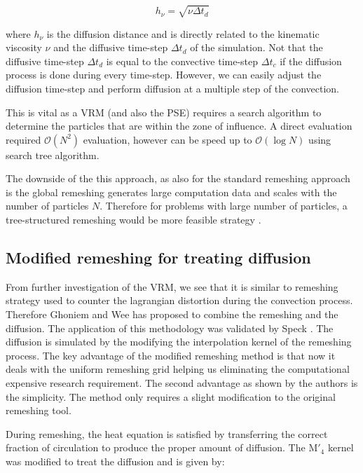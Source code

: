 	\begin{equation}
	h_{\nu} = \sqrt{\nu\Delta t_d}
	\end{equation}

where $h_{\nu}$ is the diffusion distance and is directly related to the kinematic viscosity $\nu$ and the diffusive time-step $\Delta t_d$ of the simulation. Not that the diffusive time-step $\Delta t_d$ is equal to the convective time-step $\Delta t_c$ if the diffusion process is done during every time-step. However, we can easily adjust the diffusion time-step and perform diffusion at a multiple step of the convection.

This is vital as a VRM (and also the PSE) requires a search algorithm to determine the particles that are within the zone of influence. A direct evaluation required $\mathcal{O}\left(N^2\right)$ evaluation, however can be speed up to $\mathcal{O}\left(\log N\right)$ using search tree algorithm.

The downside of the this approach, as also for the standard remeshing approach is the global remeshing generates large computation data and scales with the number of particles $N$. Therefore for problems with large number of particles, a tree-structured remeshing would be more feasible strategy \cite{Winckelmans1996}.

\subsection{Modified remeshing for treating diffusion}
From further investigation of the VRM, we see that it is similar to remeshing strategy used to counter the lagrangian distortion during the convection process. Therefore Ghoniem and Wee \cite{Wee2006} has proposed to combine the remeshing and the diffusion. The application of this methodology was validated by Speck \cite{Speck2011a}. The diffusion is simulated by the modifying the interpolation kernel of the remeshing process. The key advantage of the modified remeshing method is that now it deals with the uniform remeshing grid helping us eliminating the computational expensive research requirement. The second advantage as shown by the authors is the simplicity. The method only requires a slight modification to the original remeshing tool.

During remeshing, the heat equation is satisfied by transferring the correct fraction of circulation to produce the proper amount of diffusion. The $\mathrm{M'}_4$ kernel was modified to treat the diffusion and is given by: 

